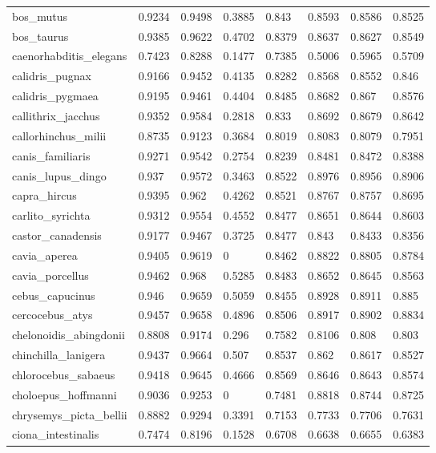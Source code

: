 \documentclass{article}
\begin{document}
\begin{table}[!h]
{\begin{tabular}{@{}llllllll@{}}
bos\_mutus & 0.9234 & 0.9498 & 0.3885 & 0.843 & 0.8593 & 0.8586 & 0.8525 \\
bos\_taurus & 0.9385 & 0.9622 & 0.4702 & 0.8379 & 0.8637 & 0.8627 & 0.8549 \\
caenorhabditis\_elegans & 0.7423 & 0.8288 & 0.1477 & 0.7385 & 0.5006 & 0.5965 & 0.5709 \\
calidris\_pugnax & 0.9166 & 0.9452 & 0.4135 & 0.8282 & 0.8568 & 0.8552 & 0.846 \\
calidris\_pygmaea & 0.9195 & 0.9461 & 0.4404 & 0.8485 & 0.8682 & 0.867 & 0.8576 \\
callithrix\_jacchus & 0.9352 & 0.9584 & 0.2818 & 0.833 & 0.8692 & 0.8679 & 0.8642 \\
callorhinchus\_milii & 0.8735 & 0.9123 & 0.3684 & 0.8019 & 0.8083 & 0.8079 & 0.7951 \\
canis\_familiaris & 0.9271 & 0.9542 & 0.2754 & 0.8239 & 0.8481 & 0.8472 & 0.8388 \\
canis\_lupus\_dingo & 0.937 & 0.9572 & 0.3463 & 0.8522 & 0.8976 & 0.8956 & 0.8906 \\
capra\_hircus & 0.9395 & 0.962 & 0.4262 & 0.8521 & 0.8767 & 0.8757 & 0.8695 \\
carlito\_syrichta & 0.9312 & 0.9554 & 0.4552 & 0.8477 & 0.8651 & 0.8644 & 0.8603 \\
castor\_canadensis & 0.9177 & 0.9467 & 0.3725 & 0.8477 & 0.843 & 0.8433 & 0.8356 \\
cavia\_aperea & 0.9405 & 0.9619 & 0 & 0.8462 & 0.8822 & 0.8805 & 0.8784 \\
cavia\_porcellus & 0.9462 & 0.968 & 0.5285 & 0.8483 & 0.8652 & 0.8645 & 0.8563 \\
cebus\_capucinus & 0.946 & 0.9659 & 0.5059 & 0.8455 & 0.8928 & 0.8911 & 0.885 \\
cercocebus\_atys & 0.9457 & 0.9658 & 0.4896 & 0.8506 & 0.8917 & 0.8902 & 0.8834 \\
chelonoidis\_abingdonii & 0.8808 & 0.9174 & 0.296 & 0.7582 & 0.8106 & 0.808 & 0.803 \\
chinchilla\_lanigera & 0.9437 & 0.9664 & 0.507 & 0.8537 & 0.862 & 0.8617 & 0.8527 \\
chlorocebus\_sabaeus & 0.9418 & 0.9645 & 0.4666 & 0.8569 & 0.8646 & 0.8643 & 0.8574 \\
choloepus\_hoffmanni & 0.9036 & 0.9253 & 0 & 0.7481 & 0.8818 & 0.8744 & 0.8725 \\
chrysemys\_picta\_bellii & 0.8882 & 0.9294 & 0.3391 & 0.7153 & 0.7733 & 0.7706 & 0.7631 \\
ciona\_intestinalis & 0.7474 & 0.8196 & 0.1528 & 0.6708 & 0.6638 & 0.6655 & 0.6383 \\

\end{tabular}}
\end{table}
\end{document}
